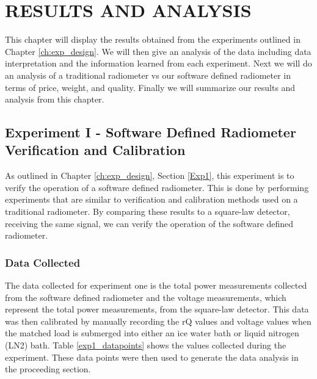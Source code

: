 


\chapter{RESULTS AND ANALYSIS}\label{ch:results}
This chapter will display the results obtained from the experiments outlined in Chapter \ref{ch:exp_design}.  We will then give an analysis of the data including data interpretation and the information learned from each experiment.  Next we will do an analysis of a traditional radiometer vs our software defined radiometer in terms of price, weight, and quality.  Finally we will summarize our results and analysis from this chapter.

\section{Experiment I - Software Defined Radiometer Verification and Calibration} \label{Exp1_results}
As outlined in Chapter \ref{ch:exp_design}, Section \ref{Exp1}, this experiment is to verify the operation of a software defined radiometer.  This is done by performing experiments that are similar to verification and calibration methods used on a traditional radiometer.  By comparing these results to a square-law detector, receiving the same signal, we can verify the operation of the software defined radiometer.

\subsection{Data Collected}\label{Exp1_data}

The data collected for experiment one is the total power measurements collected from the software defined radiometer and the voltage measurements, which represent the total power measurements, from the square-law detector.  This data was then calibrated by manually recording the rQ values and voltage values when the matched load is submerged into either an ice water bath or liquid nitrogen (LN2) bath.  Table \ref{exp1_datapoints} shows the values collected during the experiment.  These data points were then used to generate the data analysis in the proceeding section.

